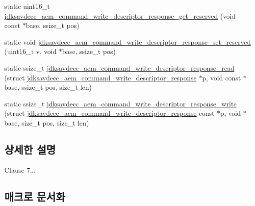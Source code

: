 \begin{DoxyCompactItemize}
\item 
static uint16\+\_\+t \hyperlink{group__command__write__descriptor__response_gaff9bbe036531fc2c8dc8731984921b78}{jdksavdecc\+\_\+aem\+\_\+command\+\_\+write\+\_\+descriptor\+\_\+response\+\_\+get\+\_\+reserved} (void const $\ast$base, ssize\+\_\+t pos)
\item 
static void \hyperlink{group__command__write__descriptor__response_gafb44a904aa2a01b7b62f5edfeff12ac0}{jdksavdecc\+\_\+aem\+\_\+command\+\_\+write\+\_\+descriptor\+\_\+response\+\_\+set\+\_\+reserved} (uint16\+\_\+t v, void $\ast$base, ssize\+\_\+t pos)
\item 
static ssize\+\_\+t \hyperlink{group__command__write__descriptor__response_gaf40d23fef9ef01ab81b8c79b72b230de}{jdksavdecc\+\_\+aem\+\_\+command\+\_\+write\+\_\+descriptor\+\_\+response\+\_\+read} (struct \hyperlink{structjdksavdecc__aem__command__write__descriptor__response}{jdksavdecc\+\_\+aem\+\_\+command\+\_\+write\+\_\+descriptor\+\_\+response} $\ast$p, void const $\ast$base, ssize\+\_\+t pos, size\+\_\+t len)
\item 
static ssize\+\_\+t \hyperlink{group__command__write__descriptor__response_ga7b15df90ad2faa62a9d732c5ba5b94d4}{jdksavdecc\+\_\+aem\+\_\+command\+\_\+write\+\_\+descriptor\+\_\+response\+\_\+write} (struct \hyperlink{structjdksavdecc__aem__command__write__descriptor__response}{jdksavdecc\+\_\+aem\+\_\+command\+\_\+write\+\_\+descriptor\+\_\+response} const $\ast$p, void $\ast$base, size\+\_\+t pos, size\+\_\+t len)
\end{DoxyCompactItemize}


\subsection{상세한 설명}
Clause 7... 

\subsection{매크로 문서화}
